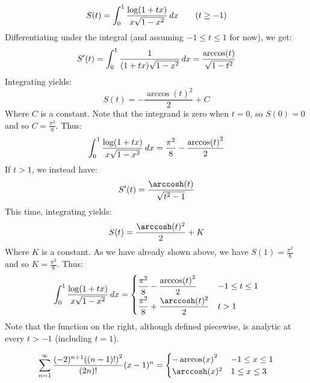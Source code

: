 \documentclass[main.tex]{subfiles}
\begin{document}
\begin{example}
    \begin{equation*}
        S(t) = \int_0^1 \frac{\log(1+tx)}{x\sqrt{1-x^2}}\,dx \tag{$t\ge -1$}
    \end{equation*}
    Differentiating under the integral (and assuming $-1\le t\le 1$ for now), we get:
    \begin{equation*}
        S'(t)
        = \int_0^1 \frac{1}{(1+tx)\sqrt{1-x^2}}\,dx
        = \frac{\arccos(t)}{\sqrt{1-t^2}}
    \end{equation*}
    Integrating yields:
    \begin{equation*}
        S(t) = -\frac{\arccos(t)^2}{2}+C
    \end{equation*}
    Where $C$ is a constant. Note that the integrand is zero when $t=0$, so $S(0)=0$ and so $C=\frac{\pi^2}{8}$. Thus:
    \begin{equation*}
        \int_0^1 \frac{\log(1+tx)}{x\sqrt{1-x^2}}\,dx
        = \frac{\pi^2}{8} - \frac{\arccos(t)^2}{2}
    \end{equation*}
    If $t>1$, we instead have:
    \begin{equation*}
        S'(t) = \frac{\arccosh(t)}{\sqrt{t^2-1}}
    \end{equation*}
    This time, integrating yields:
    \begin{equation*}
        S(t) = \frac{\arccosh(t)^2}{2}+K
    \end{equation*}
    Where $K$ is a constant. As we have already shown above, we have $S(1)=\frac{\pi^2}{8}$ and so $K=\frac{\pi^2}{8}$. Thus:
    \begin{equation*}
        \int_0^1 \frac{\log(1+tx)}{x\sqrt{1-x^2}}\dx
        = \begin{cases}
            \dfrac{\pi^2}{8}-\dfrac{\arccos(t)^2}{2} & -1\le t\le 1 \\[5pt]
            \dfrac{\pi^2}{8}+\dfrac{\arccosh(t)^2}{2} & t>1
        \end{cases}
    \end{equation*}
    Note that the function on the right, although defined piecewise, is analytic at every $t>-1$ (including $t=1$).
\end{example}

\begin{equation*}
    \sumn \frac{(-2)^{n+1}\qty((n-1)!)^2}{(2n)!}(x-1)^n
    = \begin{cases}
        -\arccos(x)^2 & -1\le x\le 1 \\
        \arccosh(x)^2 & 1\le x\le 3
    \end{cases}
\end{equation*}
\end{document}

